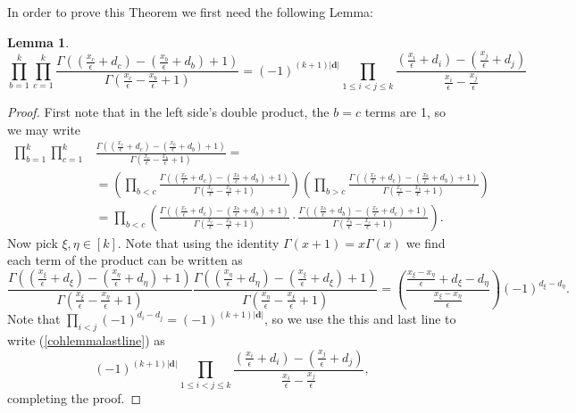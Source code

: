 \documentclass[12pt]{article}
\newtheorem{lemma}[theorem]{Lemma}%
\theoremstyle{plain}
\theoremstyle{definition}
\newcommand{\db}{\boldsymbol{d}}
\begin{document}
In order to prove this Theorem we first need the following Lemma:
\begin{lemma} \label{lemmaratioceq}
    \begin{equation}
        \prod \limits_{b=1}^k \prod \limits_{c=1} ^k \frac{\Gamma((\frac{x_c}{\epsilon}+d_c)-(\frac{x_b}{\epsilon}+d_b)+1)}{\Gamma(\frac{x_c}{\epsilon}-\frac{x_b}{\epsilon}+1)}=(-1)^{(k+1)|\db|}\prod \limits_{1\leq i<j\leq k} \frac{ (\frac{x_i}{\epsilon}+d_i)-(\frac{x_j}{\epsilon}+d_j)}{\frac{x_i}{\epsilon}-\frac{x_j}{\epsilon}} 
    \end{equation}
\end{lemma}
\begin{proof}
First note that in the left side's double product, the $b=c$ terms are 1, so we may write 
\begin{align}
     \prod \limits_{b=1}^k \prod \limits_{c=1} ^k &\frac{\Gamma((\frac{x_c}{\epsilon}+d_c)-(\frac{x_b}{\epsilon}+d_b)+1)}{\Gamma(\frac{x_c}{\epsilon}-\frac{x_b}{\epsilon}+1)} = \nonumber \\
     &=\left(\prod \limits_{b<c} \frac{\Gamma((\frac{x_c}{\epsilon}+d_c)-(\frac{x_b}{\epsilon}+d_b)+1)}{\Gamma(\frac{x_c}{\epsilon}-\frac{x_b}{\epsilon}+1)}\right)\left(\prod \limits_{b>c} \frac{\Gamma((\frac{x_c}{\epsilon}+d_c)-(\frac{x_b}{\epsilon}+d_b)+1)}{\Gamma(\frac{x_c}{\epsilon}-\frac{x_b}{\epsilon}+1)}\right) \nonumber \\
     &=\prod \limits_{b<c} \left(\frac{\Gamma((\frac{x_c}{\epsilon}+d_c)-(\frac{x_b}{\epsilon}+d_b)+1)}{\Gamma(\frac{x_c}{\epsilon}-\frac{x_b}{\epsilon}+1)}\cdot \frac{\Gamma((\frac{x_b}{\epsilon}+d_b)-(\frac{x_c}{\epsilon}+d_c)+1)}{\Gamma(\frac{x_b}{\epsilon}-\frac{x_c}{\epsilon}+1)}\right). \label{cohlemmalastline}
\end{align}
Now pick $\xi,\eta \in [k]$. Note that using the identity $\Gamma(x+1)=x\Gamma(x)$ we find each term of the product can be written as 
\begin{equation*}
\frac{\Gamma((\frac{x_\xi}{\epsilon}+d_\xi)-(\frac{x_\eta}{\epsilon}+d_\eta)+1)}{\Gamma(\frac{x_\xi}{\epsilon}-\frac{x_\eta}{\epsilon}+1)}\frac{\Gamma((\frac{x_\eta}{\epsilon}+d_\eta)-(\frac{x_\xi}{\epsilon}+d_\xi)+1)}{\Gamma(\frac{x_\eta}{\epsilon}-\frac{x_\xi}{\epsilon}+1)} =\left(\frac{\frac{x_\xi-x_\eta}{\epsilon}+d_\xi-d_\eta}{\frac{x_\xi-x_\eta}{\epsilon}}\right) (-1)^{d_\xi-d_\eta}.
\end{equation*}
 Note that $\prod_{i<j} (-1)^{d_i-d_j}= (-1)^{(k+1)|\db|}$, so we use the this and last line to write (\ref{cohlemmalastline}) as
$$
(-1)^{(k+1)|\db|}\prod \limits_{1\leq i<j\leq k} \frac{ (\frac{x_i}{\epsilon}+d_i)-(\frac{x_j}{\epsilon}+d_j)}{\frac{x_i}{\epsilon}-\frac{x_j}{\epsilon}} ,
$$
completing the proof.

\end{proof}
\end{document}
